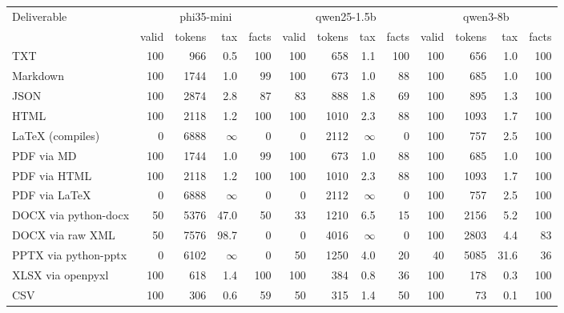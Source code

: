 \begin{tabular}{lrrrrrrrrrrrr}
\toprule
Deliverable & \multicolumn{4}{c}{phi35-mini} & \multicolumn{4}{c}{qwen25-1.5b} & \multicolumn{4}{c}{qwen3-8b} \\
 & valid & tokens & tax & facts & valid & tokens & tax & facts & valid & tokens & tax & facts \\
\midrule
TXT & 100 & 966 & 0.5 & 100 & 100 & 658 & 1.1 & 100 & 100 & 656 & 1.0 & 100 \\
Markdown & 100 & 1744 & 1.0 & 99 & 100 & 673 & 1.0 & 88 & 100 & 685 & 1.0 & 100 \\
JSON & 100 & 2874 & 2.8 & 87 & 83 & 888 & 1.8 & 69 & 100 & 895 & 1.3 & 100 \\
HTML & 100 & 2118 & 1.2 & 100 & 100 & 1010 & 2.3 & 88 & 100 & 1093 & 1.7 & 100 \\
LaTeX (compiles) & 0 & 6888 & $\infty$ & 0 & 0 & 2112 & $\infty$ & 0 & 100 & 757 & 2.5 & 100 \\
PDF via MD & 100 & 1744 & 1.0 & 99 & 100 & 673 & 1.0 & 88 & 100 & 685 & 1.0 & 100 \\
PDF via HTML & 100 & 2118 & 1.2 & 100 & 100 & 1010 & 2.3 & 88 & 100 & 1093 & 1.7 & 100 \\
PDF via LaTeX & 0 & 6888 & $\infty$ & 0 & 0 & 2112 & $\infty$ & 0 & 100 & 757 & 2.5 & 100 \\
DOCX via python-docx & 50 & 5376 & 47.0 & 50 & 33 & 1210 & 6.5 & 15 & 100 & 2156 & 5.2 & 100 \\
DOCX via raw XML & 50 & 7576 & 98.7 & 0 & 0 & 4016 & $\infty$ & 0 & 100 & 2803 & 4.4 & 83 \\
PPTX via python-pptx & 0 & 6102 & $\infty$ & 0 & 50 & 1250 & 4.0 & 20 & 40 & 5085 & 31.6 & 36 \\
XLSX via openpyxl & 100 & 618 & 1.4 & 100 & 100 & 384 & 0.8 & 36 & 100 & 178 & 0.3 & 100 \\
CSV & 100 & 306 & 0.6 & 59 & 50 & 315 & 1.4 & 50 & 100 & 73 & 0.1 & 100 \\
\bottomrule
\end{tabular}
